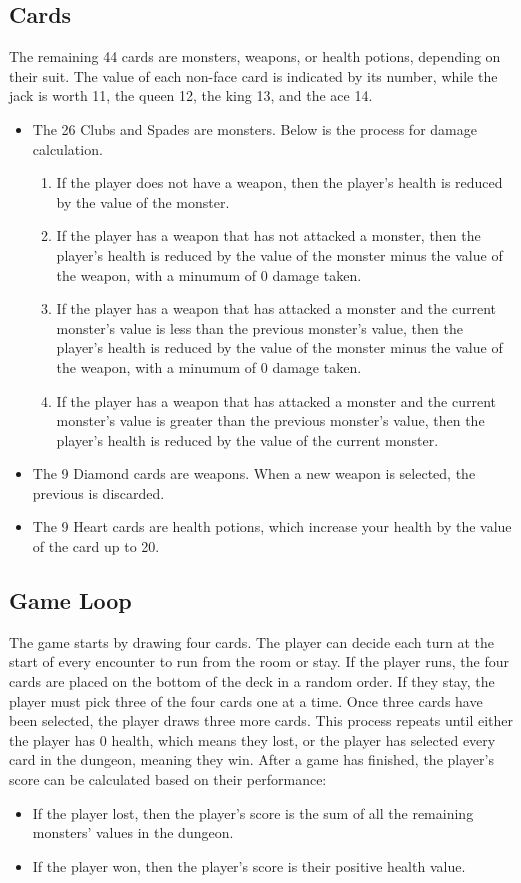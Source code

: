 \documentclass{article}
\begin{document}
\subsection{Cards}
The remaining 44 cards are monsters, weapons, or health potions, depending on their suit. The value of each non-face card is indicated by its number, while the jack is worth 11, the queen 12, the king 13, and the ace 14.
\begin{itemize}
  \item The 26 Clubs and Spades are monsters. Below is the process for damage calculation.
    \begin{enumerate}
      \item If the player does not have a weapon, then the player's health is reduced by the value of the monster.
      \item If the player has a weapon that has not attacked a monster, then the player's health is reduced by the value of the monster minus the value of the weapon, with a minumum of 0 damage taken.
      \item If the player has a weapon that has attacked a monster and the current monster's value is less than the previous monster's value, then the player's health is reduced by the value of the monster minus the value of the weapon, with a minumum of 0 damage taken.
      \item If the player has a weapon that has attacked a monster and the current monster's value is greater than the previous monster's value, then the player's health is reduced by the value of the current monster.
    \end{enumerate}
  \item The 9 Diamond cards are weapons. When a new weapon is selected, the previous is discarded.
  \item The 9 Heart cards are health potions, which increase your health by the value of the card up to 20.
\end{itemize}

\subsection{Game Loop}
The game starts by drawing four cards. The player can decide each turn at the start of every encounter to run from the room or stay. If the player runs, the four cards are placed on the bottom of the deck in a random order. If they stay, the player must pick three of the four cards one at a time. Once three cards have been selected, the player draws three more cards. This process repeats until either the player has 0 health, which means they lost, or the player has selected every card in the dungeon, meaning they win. After a game has finished, the player's score can be calculated based on their performance:
\begin{itemize}
  \item If the player lost, then the player's score is the sum of all the remaining monsters' values in the dungeon.
  \item If the player won, then the player's score is their positive health value.
\end{itemize}
\end{document}
